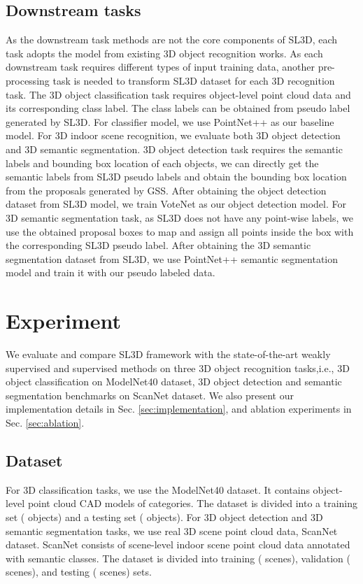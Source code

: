 \documentclass{article}
\begin{document}
\subsection{Downstream tasks}

As the downstream task methods are not the core components of SL3D, each task adopts the model from existing 3D object recognition works. As each downstream task requires different types of input training data, another pre-processing task is needed to transform SL3D dataset for each 3D recognition task. The 3D object classification task requires object-level point cloud data and its corresponding class label. The class labels can be obtained from pseudo label generated by SL3D. For classifier model, we use PointNet++ \cite{qi2017pointnetplusplus} as our baseline model. For 3D indoor scene recognition, we evaluate both 3D object detection and 3D semantic segmentation. 3D object detection task requires the semantic labels and bounding box location of each objects, we can directly get the semantic labels from SL3D pseudo labels and obtain the bounding box location from the proposals generated by GSS. After obtaining the object detection dataset from SL3D model, we train VoteNet \cite{qi2019deep} as our object detection model. For 3D semantic segmentation task, as SL3D does not have any point-wise labels, we use the obtained proposal boxes to map and assign all points inside the box with the corresponding SL3D pseudo label. After obtaining the 3D semantic segmentation dataset from SL3D, we use PointNet++ \cite{qi2017pointnetplusplus} semantic segmentation model and train it with our pseudo labeled data.

\section{Experiment}
\label{sec:exp}
We evaluate and compare SL3D framework with the state-of-the-art weakly supervised and supervised methods on three 3D object recognition tasks,i.e., 3D object classification on ModelNet40 \cite{wu20153d} dataset, 3D object detection and semantic segmentation benchmarks on ScanNet \cite{dai2017scannet} dataset. We also present our implementation details in Sec. \ref{sec:implementation}, and ablation experiments in Sec. \ref{sec:ablation}.

\subsection{Dataset} 
For 3D classification tasks, we use the ModelNet40 dataset. It contains  object-level point cloud CAD models of  categories. The dataset is divided into a training set ( objects) and a testing set ( objects). For 3D object detection and 3D semantic segmentation tasks, we use real 3D scene point cloud data, ScanNet \cite{dai2017scannet} dataset. ScanNet consists of  scene-level indoor scene point cloud data annotated with  semantic classes. The dataset is divided into training ( scenes), validation ( scenes), and testing ( scenes) sets. 
\end{document}
